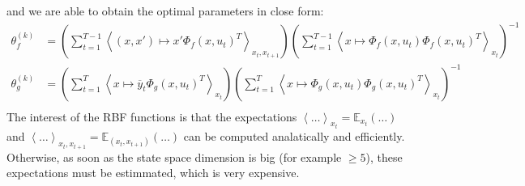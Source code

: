 and we are able to obtain the optimal parameters in close form:
\begin{align*}
  \theta_f^{(k)} &=
    \left(
      \sum_{t=1}^{T-1}{\left< (x,x') \mapsto x' \Phi_f(x,u_t)^T \right>_{x_t,x_{t+1}}}
    \right)
    \left(
      \sum_{t=1}^{T-1}{\left< x \mapsto \Phi_f(x, u_t)\Phi_f(x,u_t)^T \right>_{x_t}}
    \right)^{-1}
  \\
  \theta_g^{(k)} &=
    \left(
      \sum_{t=1}^{T}{\left< x \mapsto \overline{y}_{t}\Phi_g(x,u_t)^T \right>_{x_t}}
    \right)
    \left(
      \sum_{t=1}^{T}{\left< x \mapsto \Phi_g(x,u_t)\Phi_g(x,u_t)^T \right>_{x_t}}
    \right)^{-1}
    \\
\end{align*}
The interest of the RBF functions is that the expectations $\left< \ldots \right>_{x_t} = \mathbb{E}_{x_t} ( \ldots )$ and  $\left< \ldots \right>_{x_t,x_{t+1}} = \mathbb{E}_{(x_t, x_{t+1})}( \ldots )$ can be computed analatically and efficiently.
Otherwise, as soon as the state space dimension is big (for example $\geq 5$), these expectations must be estimmated, which is very expensive.


